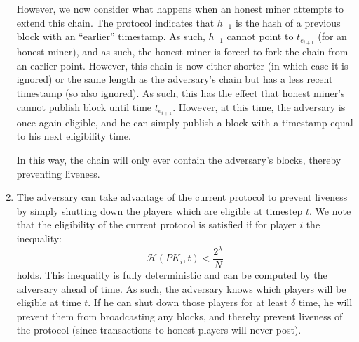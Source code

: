 \documentclass[12pt]{exam}
\begin{document}
\begin{questions}
\begin{solution}
\begin{enumerate}[label=\textbf{\alph*.}]
      However, we now consider what happens when an honest miner attempts to extend this chain. The protocol indicates that $h_{-1}$ is the hash of a previous block with an ``earlier'' timestamp. As such, $h_{-1}$ cannot point to $t_{e_{i+1}}$ (for an honest miner), and as such, the honest miner is forced to fork the chain from an earlier point. However, this chain is now either shorter (in which case it is ignored) or the same length as the adversary's chain but has a less recent timestamp (so also ignored). As such, this has the effect that honest miner's cannot publish block until time $t_{e_{i+1}}$. However, at this time, the adversary is once again eligible, and he can simply publish a block with a timestamp equal to his next eligibility time.

      In this way, the chain will only ever contain the adversary's blocks, thereby preventing liveness.
    \item
      The adversary can take advantage of the current protocol to prevent liveness by simply shutting down the players which are eligible at timestep $t$. We note that the eligibility of the current protocol is satisfied if for player $i$ the inequality:
      \[
        \mathcal{H}(PK_i, t) < \frac{2^\lambda}{N}
      \]
      holds. This inequality is fully deterministic and can be computed by the adversary ahead of time. As such, the adversary knows which players will be eligible at time $t$. If he can shut down those players for at least $\delta$ time, he will prevent them from broadcasting any blocks, and thereby prevent liveness of the protocol (since transactions to honest players will never post).


\end{enumerate}
\end{solution}
\end{questions}
\end{document}
